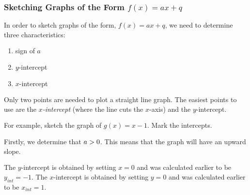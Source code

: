             \subsubsection{ Sketching Graphs of the Form $f\left(x\right)=ax+q$}
            \nopagebreak
          \label{m39338*id239401}In order to sketch graphs of the form, $f\left(x\right)=ax+q$, we need to determine three characteristics:\par 
          \label{m39338*id239434}\begin{enumerate}[noitemsep, label=\textbf{\arabic*}. ] 
            \label{m39338*uid90}\item sign of $a$\label{m39338*uid91}\item $y$-intercept
\label{m39338*uid92}\item $x$-intercept
\end{enumerate}
          \label{m39338*id239497}Only two points are needed to plot a straight line graph. The easiest points to use are the \textsl{$x$-intercept} (where the line cuts the $x$-axis) and the $y$-intercept.\par 
          \label{m39338*id239534}For example, sketch the graph of $g\left(x\right)=x-1$. Mark the intercepts.\par 
          \label{m39338*id239565}Firstly, we determine that $a>{}0$. This means that the graph will have an upward slope.\par 
          \label{m39338*id239585}The $y$-intercept is obtained by setting $x=0$ and was calculated earlier to be ${y}_{int}=-1$. The $x$-intercept is obtained by setting $y=0$ and was calculated earlier to be ${x}_{int}=1$.\par 
    \setcounter{subfigure}{0}
